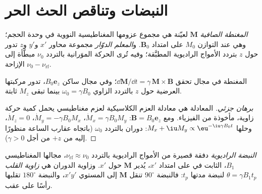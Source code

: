 \section{النبضات وتناقص الحث الحر}

\begin{definition}\label{def:b3:advanced-nmr:magnetisation}
\emph{المغنطة الصافية} $\mathbf M$ لعيّنة هي
مجموع عزومها المغناطيسية النووية في وحدة الحجم؛ وهي عند التوازن
$M_0$ على امتداد $\mathbf B_0$. و\emph{المعلم الدوّار} مجموعة
محاور $x'$ و$y'$ و$z$ تدور حول $z$ بتردد الأمواج الراديوية
المطبَّقة؛ وفيه تُرى الحركة الموَرانية بالتردد $\nu_0$ مبطَّأة إلى الإزاحة $\nu_0 -
\nu_{\mathrm{rf}}$.
\end{definition}

\begin{proposition}\label{prop:b3:advanced-nmr:precession}
المغنطة في مجال تحقق $\dd\mathbf M/\dd t = \gamma\,\mathbf M\times\mathbf B$؛ وفي
مجال ساكن $B_0\mathbf e_z$، تدور مركبتها العرضية حول $z$ بالتردد
الزاوي $\omega_0 = \gamma B_0$ بينما تبقى $M_z$ ثابتة.
\end{proposition}

\begin{proof}[برهان جزئي]
المعادلة هي معادلة العزم الكلاسيكية لعزم مغناطيسي يحمل
كمية حركة زاوية، مأخوذة من الفيزياء. ومع $\mathbf B = B_0\mathbf e_z$: $\dot M_x = \gamma
B_0M_y$، $\dot M_y = -\gamma B_0M_x$، $\dot M_z = 0$، وحلها $M_x + \iu M_y \propto
\eu^{-\iu\gamma B_0t}$: دوران بالتردد $\omega_0$ (باتجاه عقارب الساعة منظورًا إليه من $+z$ من أجل $\gamma > 0$).
\end{proof}

\begin{definition}\label{def:b3:advanced-nmr:pulse}
\emph{النبضة الراديوية} دفقة قصيرة من
الأمواج الراديوية بالتردد $\nu_{\mathrm{rf}} \approx \nu_0$، مجالها المغناطيسي $B_1$، الثابت في
 على امتداد $x'$، يُدير $\mathbf M$ حول $x'$. وزاوية الدوران هي
\emph{زاوية القلب} $\theta = \gamma B_1t_p$ لنبضة مدتها
$t_p$: فالنبضة $90^\circ$ تنقل $\mathbf M$ إلى المستوي $x'y'$، والنبضة $180^\circ$ تقلبها
رأسًا على عقب.
\end{definition}

